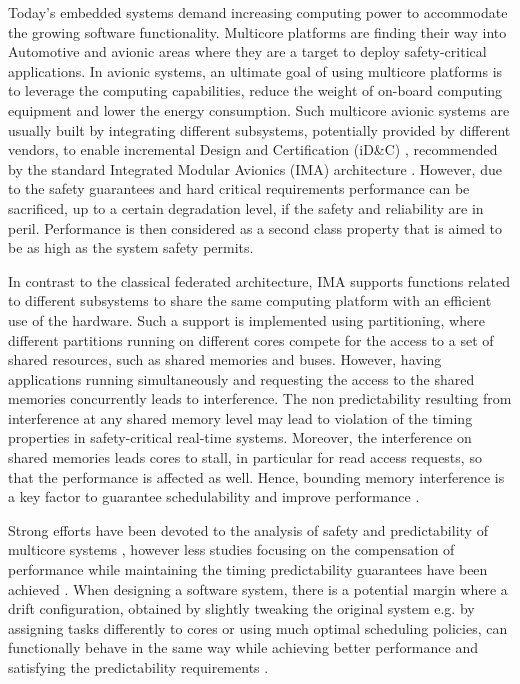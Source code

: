 \label{sec:introduction}


Today's embedded systems demand increasing computing power to accommodate the growing software functionality. 
Multicore platforms are finding their way into Automotive and avionic areas where they are a target to deploy safety-critical applications. In avionic systems, an ultimate goal of using multicore platforms is to leverage the computing capabilities, reduce the weight of on-board computing equipment and lower the energy consumption. Such multicore avionic systems are usually built by integrating different subsystems, potentially provided by different vendors, to enable incremental Design and Certification (iD\&C) \cite{iDC}, recommended by the standard Integrated Modular Avionics (IMA) architecture \cite{ima}. 
%
However, due to the safety guarantees and hard critical requirements performance can be sacrificed, up to a certain degradation level, if the safety and reliability are in peril. Performance is then considered as a second class property that is aimed to be as high as the system safety permits.  

In contrast to the classical federated architecture, IMA supports functions related to different subsystems to share the same computing platform with an efficient use of the hardware. Such a support is implemented using partitioning, where different partitions running on different cores compete for the access to a set of shared resources, such as shared memories and buses. 
%
However, having applications running simultaneously and requesting the access to the shared memories concurrently leads to interference. The non predictability resulting from interference at any shared memory level may lead to violation of the timing properties in safety-critical real-time systems. Moreover, the interference on shared memories leads cores to stall, in particular for read access requests, so that the performance is affected as well. Hence, bounding memory interference is a key factor to guarantee schedulability and improve performance \cite{Kim14}.

Strong efforts have been devoted to the analysis of safety and predictability of multicore systems \cite{Lisper14,Nowotsch14,Andersson2010,Chatto2012,5753612}, however less studies focusing on the compensation of performance while maintaining the timing predictability guarantees have been achieved \cite{DBLP:journals/corr/TeodoroKAKFS15,6280389,Sarkar:2011:PTM:1967677.1967696,10.1109/MS.2005.102,Subramanian13}. When designing a software system, there is a potential margin where a drift configuration, obtained by slightly tweaking the original system e.g. by assigning tasks differently to cores or using much optimal scheduling policies, can functionally behave in the same way while achieving better performance and satisfying the predictability requirements \cite{SHARMA2014544,Sarkar:2011:PTM:1967677.1967696,5753612}.   

